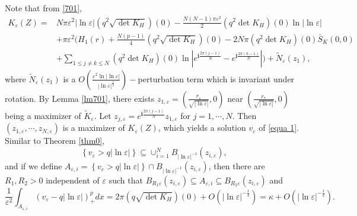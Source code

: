 \documentclass[12pt,reqno]{amsart}
\numberwithin{equation}{section}
\theoremstyle{definition}
\theoremstyle{remark}
\begin{document}
Note that from \eqref{701},
\begin{equation*}  
\begin{split}
K_\varepsilon\left (Z\right )
=&N\pi\varepsilon^2|\ln\varepsilon|\left( q^2\sqrt{\det K_H}\right)(0)-\frac{N(N-1)\pi\varepsilon^2}{2}\left( q^2\det K_H\right)(0)\ln|\ln\varepsilon|\\
&+\pi\varepsilon^2\bigg(  H_1(r)+ \frac{N(p-1)}{4}   \left( q^2\sqrt{\det K_H}\right) (0)      -2N\pi   \left( q^2  \det K_H\right)(0) \bar{S}_K(0,0)\\
&+\sum_{1\leq j\neq k\leq N}\left( q^2  \det K_H\right)(0)\ln| e^{\textbf{i}\frac{2\pi(j-1)}{N}} - e^{\textbf{i}\frac{2\pi(k-1)}{N}} |\bigg)  
+\tilde{N}_\varepsilon(z_1),
\end{split}
\end{equation*}
where $ \tilde{N}_\varepsilon(z_1) $ is a $O\left( \frac{\varepsilon^2\ln|\ln\varepsilon|}{|\ln\varepsilon|^{\frac{1}{2}}}\right) -$perturbation term which is invariant under rotation. %
By Lemma \ref{lm701}, there exists $ z_{1,\varepsilon}=\left( \frac{r_\varepsilon}{\sqrt{|\ln\varepsilon|}},0\right)  $ near $ \left( \frac{r_*}{\sqrt{|\ln\varepsilon|}},0\right) $ being a maximizer of $ \tilde{K}_\varepsilon  $.  Let $ z_{j,\varepsilon}=e^{\textbf{i}\frac{2\pi(j-1)}{N}}z_{1,\varepsilon} $ for $ j=1,\cdots,N. $ Then $ \left( z_{1,\varepsilon},\cdots,z_{N,\varepsilon} \right) $ is a maximizer of $ K_\varepsilon(Z) $, which yields a solution $ v_\varepsilon $ of \eqref{equa 1}. Similar to Theorem \ref{thm0}, %
\begin{equation*}
\left \{v_\varepsilon>q|\ln\varepsilon|\right \}\subseteq \cup_{i=1}^N B_{|\ln\varepsilon|^{-1}}\left (z_{i,\varepsilon}\right ),
\end{equation*}
and if we define $ A_{\varepsilon,i}=\left\{v_\varepsilon>q|\ln\varepsilon|\right\}\cap B_{|\ln\varepsilon|^{-1}}\left (z_{i,\varepsilon}\right )  $, then there are $ R_1,R_2>0 $ independent of $ \varepsilon $  such that $ B_{R_1\varepsilon}\left ( z_{i,\varepsilon}\right )\subseteq A_{\varepsilon,i}\subseteq B_{R_2\varepsilon}\left (z_{i,\varepsilon}\right ) $ and 
\begin{equation*}
\frac{1}{\varepsilon^2}\int_{A_{\varepsilon,i}}\left( v_\varepsilon-q|\ln\varepsilon|\right)^{p}_+dx=2\pi \left( q\sqrt{\det K_H }\right) (0)+O\left(|\ln\varepsilon|^{-\frac{1}{2}} \right) = \kappa+O\left(|\ln\varepsilon|^{-\frac{1}{2}} \right).
\end{equation*}
\end{document}

